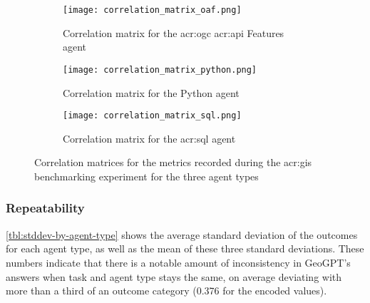 \begin{figure}[htp]
    \centering

    \begin{subfigure}[b]{\textwidth}
        \texttt{[image: correlation\_matrix\_oaf.png]}
        \caption{Correlation matrix for the \acrshort{acr:ogc} \acrshort{acr:api} Features agent}
        \label{fig:sub1}
    \end{subfigure}

    \vspace{1cm}

    \begin{subfigure}[b]{\textwidth}
        \texttt{[image: correlation\_matrix\_python.png]}
        \caption{Correlation matrix for the Python agent}
        \label{fig:sub2}
    \end{subfigure}

    \vspace{1cm}

    \begin{subfigure}[b]{\textwidth}
        \texttt{[image: correlation\_matrix\_sql.png]}
        \caption{Correlation matrix for the \acrshort{acr:sql} agent}
        \label{fig:sub3}
    \end{subfigure}

    \caption{Correlation matrices for the metrics recorded during the \acrshort{acr:gis} benchmarking experiment for the three agent types}
    \label{fig:correlation-matrices}
\end{figure}

\subsubsection{Repeatability}

\autoref{tbl:stddev-by-agent-type} shows the average standard deviation of the outcomes for each agent type, as well as the mean of these three standard deviations. These numbers indicate that there is a notable amount of inconsistency in GeoGPT's answers when task and agent type stays the same, on average deviating with more than a third of an outcome category (0.376 for the encoded values).

